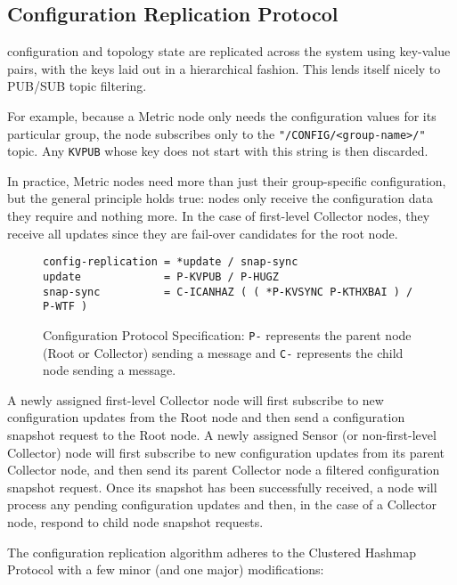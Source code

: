 \subsection{Configuration Replication Protocol}
\label{proto_config}

\dcamp configuration and topology state are replicated across the system using key-value pairs, with the keys laid out
in a hierarchical fashion. This lends itself nicely to PUB/SUB topic filtering.

For example, because a Metric node only needs the configuration values for its particular group, the node subscribes
only to the \texttt{"/CONFIG/<group-name>/"} topic. Any \texttt{KVPUB} whose key does not start with this string is
then discarded.

In practice, Metric nodes need more than just their group-specific configuration, but the general principle holds true:
nodes only receive the configuration data they require and nothing more. In the case of first-level Collector nodes, they
receive all updates since they are fail-over candidates for the root node.

\begin{figure}[H]
\vspace{+10pt}
\begin{verbatim}
config-replication = *update / snap-sync
update             = P-KVPUB / P-HUGZ
snap-sync          = C-ICANHAZ ( ( *P-KVSYNC P-KTHXBAI ) / P-WTF )
\end{verbatim}
\vspace{-5pt}
\caption[Configuration Protocol Specification]
	{Configuration Protocol Specification: \texttt{P-} represents the parent node (Root or Collector) sending a
	 message and \texttt{C-} represents the child node sending a message.}
\label{fig:proto_config_spec}
\end{figure}

A newly assigned first-level Collector node will first subscribe to new configuration updates from the Root node and
then send a configuration snapshot request to the Root node. A newly assigned Sensor (or non-first-level Collector) node
will first subscribe to new configuration updates from its parent Collector node, and then send its parent Collector
node a filtered configuration snapshot request. Once its snapshot has been successfully received, a node will process
any pending configuration updates and then, in the case of a Collector node, respond to child node snapshot requests.

The \dcamp configuration replication algorithm adheres to the Clustered Hashmap Protocol\cite{chp} with a few minor
(and one major) modifications:


